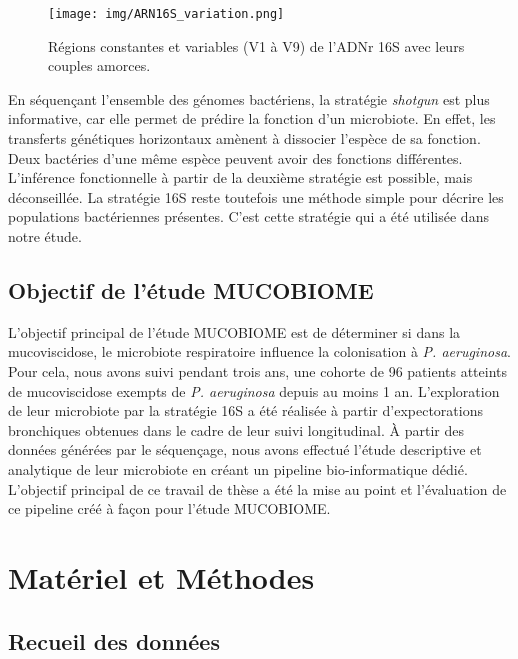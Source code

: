 \documentclass[12pt,a4paper]{article}
\begin{document}
\begin{figure}[ht]
\begin{center}
\texttt{[image: img/ARN16S\_variation.png]}\hfill
\end{center}
\caption{Régions constantes et variables (V1 à V9) de l'ADNr 16S avec leurs couples amorces.}
\label{ARN16SVariation}
\end{figure}

En séquençant l'ensemble des génomes bactériens, la stratégie \textit{shotgun} est plus informative, car elle permet de prédire la fonction d'un microbiote. En effet, les transferts génétiques horizontaux amènent à dissocier l'espèce de sa fonction. Deux bactéries d'une même espèce peuvent avoir des fonctions différentes. L'inférence fonctionnelle à partir de la deuxième stratégie est possible, mais déconseillée.
La stratégie 16S reste toutefois une méthode simple pour décrire les populations bactériennes présentes. C'est cette stratégie qui a été utilisée dans notre étude.



\subsection{Objectif de l'étude MUCOBIOME}
L'objectif principal de l'étude MUCOBIOME est de déterminer si dans la mucoviscidose, le microbiote respiratoire influence la colonisation à \textit{P. aeruginosa}.
Pour cela, nous avons suivi pendant trois ans,  une cohorte de 96 patients atteints de mucoviscidose exempts de \textit{P. aeruginosa} depuis au moins 1 an.
L'exploration de leur microbiote par la stratégie 16S a été réalisée à partir d'expectorations bronchiques obtenues dans le cadre de leur suivi longitudinal.
À partir des données générées par le séquençage, nous avons effectué l'étude descriptive et analytique de leur microbiote en créant un pipeline bio-informatique dédié. L'objectif principal de ce travail de thèse a été la mise au point et l'évaluation de ce pipeline créé à façon pour l'étude MUCOBIOME.
\newpage
\section{Matériel et Méthodes}
\subsection{Recueil des données}
\end{document}
